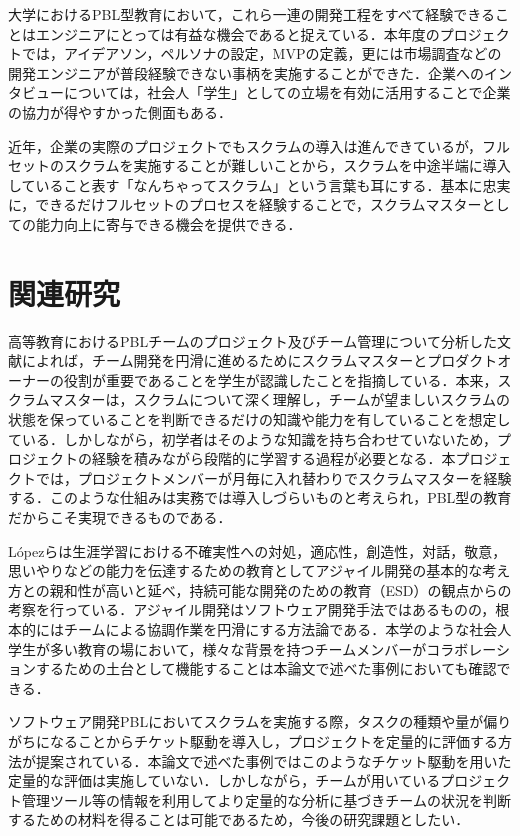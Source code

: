 \documentclass[fontsize=9pt, jafontscale=.95, twocolumn, a4paper]{jlreq}
\begin{document}
大学におけるPBL型教育において，これら一連の開発工程をすべて経験できることはエンジニアにとっては有益な機会であると捉えている．本年度のプロジェクトでは，アイデアソン，ペルソナの設定，MVPの定義，更には市場調査などの開発エンジニアが普段経験できない事柄を実施することができた．企業へのインタビューについては，社会人「学生」としての立場を有効に活用することで企業の協力が得やすかった側面もある．

近年，企業の実際のプロジェクトでもスクラムの導入は進んできているが，フルセットのスクラムを実施することが難しいことから，スクラムを中途半端に導入していること表す「なんちゃってスクラム」という言葉も耳にする．基本に忠実に，できるだけフルセットのプロセスを経験することで，スクラムマスターとしての能力向上に寄与できる機会を提供できる．

\section{関連研究}
高等教育におけるPBLチームのプロジェクト及びチーム管理について分析した文献\cite{Fernandes2021}によれば，チーム開発を円滑に進めるためにスクラムマスターとプロダクトオーナーの役割が重要であることを学生が認識したことを指摘している．本来，スクラムマスターは，スクラムについて深く理解し，チームが望ましいスクラムの状態を保っていることを判断できるだけの知識や能力を有していることを想定している．しかしながら，初学者はそのような知識を持ち合わせていないため，プロジェクトの経験を積みながら段階的に学習する過程が必要となる．本プロジェクトでは，プロジェクトメンバーが月毎に入れ替わりでスクラムマスターを経験する．このような仕組みは実務では導入しづらいものと考えられ，PBL型の教育だからこそ実現できるものである．

López\cite{Lopez2019}らは生涯学習における不確実性への対処，適応性，創造性，対話，敬意，思いやりなどの能力を伝達するための教育としてアジャイル開発の基本的な考え方との親和性が高いと延べ，持続可能な開発のための教育（ESD）の観点からの考察を行っている．アジャイル開発はソフトウェア開発手法ではあるものの，根本的にはチームによる協調作業を円滑にする方法論である．本学のような社会人学生が多い教育の場において，様々な背景を持つチームメンバーがコラボレーションするための土台として機能することは本論文で述べた事例においても確認できる．

ソフトウェア開発PBLにおいてスクラムを実施する際，タスクの種類や量が偏りがちになることからチケット駆動を導入し，プロジェクトを定量的に評価する方法が提案されている\cite{井垣15}．本論文で述べた事例ではこのようなチケット駆動を用いた定量的な評価は実施していない．しかしながら，チームが用いているプロジェクト管理ツール等の情報を利用してより定量的な分析に基づきチームの状況を判断するための材料を得ることは可能であるため，今後の研究課題としたい．
\end{document}
